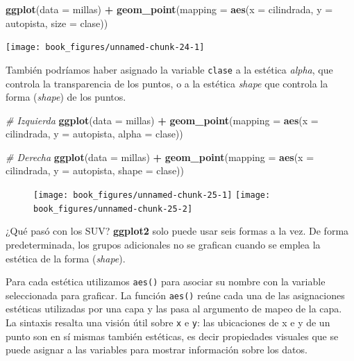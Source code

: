 \documentclass[11pt,oneside]{report}
\newenvironment{Shaded}{\begin{snugshade}}{\end{snugshade}}
\newcommand{\CommentTok}[1]{\textcolor[rgb]{0.56,0.35,0.01}{\textit{#1}}}
\newcommand{\DataTypeTok}[1]{\textcolor[rgb]{0.13,0.29,0.53}{#1}}
\newcommand{\KeywordTok}[1]{\textcolor[rgb]{0.13,0.29,0.53}{\textbf{#1}}}
\newcommand{\NormalTok}[1]{#1}
\newcommand{\OperatorTok}[1]{\textcolor[rgb]{0.81,0.36,0.00}{\textbf{#1}}}
\newcommand{\StringTok}[1]{\textcolor[rgb]{0.31,0.60,0.02}{#1}}
\begin{document}
\begin{Shaded}
\begin{Highlighting}[]
\KeywordTok{ggplot}\NormalTok{(}\DataTypeTok{data =}\NormalTok{ millas) }\OperatorTok{+}
\StringTok{  }\KeywordTok{geom_point}\NormalTok{(}\DataTypeTok{mapping =} \KeywordTok{aes}\NormalTok{(}\DataTypeTok{x =}\NormalTok{ cilindrada, }\DataTypeTok{y =}\NormalTok{ autopista, }\DataTypeTok{size =}\NormalTok{ clase))}
\end{Highlighting}
\end{Shaded}

\begin{center}\texttt{[image: book\_figures/unnamed-chunk-24-1]} \end{center}

También podríamos haber asignado la variable \texttt{clase} a la
estética \emph{alpha}, que controla la transparencia de los puntos, o a
la estética \emph{shape} que controla la forma (\emph{shape}) de los
puntos.

\begin{Shaded}
\begin{Highlighting}[]
\CommentTok{# Izquierda}
\KeywordTok{ggplot}\NormalTok{(}\DataTypeTok{data =}\NormalTok{ millas) }\OperatorTok{+}
\StringTok{  }\KeywordTok{geom_point}\NormalTok{(}\DataTypeTok{mapping =} \KeywordTok{aes}\NormalTok{(}\DataTypeTok{x =}\NormalTok{ cilindrada, }\DataTypeTok{y =}\NormalTok{ autopista, }\DataTypeTok{alpha =}\NormalTok{ clase))}

\CommentTok{# Derecha}
\KeywordTok{ggplot}\NormalTok{(}\DataTypeTok{data =}\NormalTok{ millas) }\OperatorTok{+}
\StringTok{  }\KeywordTok{geom_point}\NormalTok{(}\DataTypeTok{mapping =} \KeywordTok{aes}\NormalTok{(}\DataTypeTok{x =}\NormalTok{ cilindrada, }\DataTypeTok{y =}\NormalTok{ autopista, }\DataTypeTok{shape =}\NormalTok{ clase))}
\end{Highlighting}
\end{Shaded}

\begin{figure}
\texttt{[image: book\_figures/unnamed-chunk-25-1]} \texttt{[image: book\_figures/unnamed-chunk-25-2]} \end{figure}

¿Qué pasó con los SUV? \textbf{ggplot2} solo puede usar seis formas a la
vez. De forma predeterminada, los grupos adicionales no se grafican
cuando se emplea la estética de la forma (\emph{shape}).

Para cada estética utilizamos \texttt{aes()} para asociar su nombre con
la variable seleccionada para graficar. La función \texttt{aes()} reúne
cada una de las asignaciones estéticas utilizadas por una capa y las
pasa al argumento de mapeo de la capa. La sintaxis resalta una visión
útil sobre \texttt{x} e \texttt{y}: las ubicaciones de x e y de un punto
son en sí mismas también estéticas, es decir propiedades visuales que se
puede asignar a las variables para mostrar información sobre los datos.
\end{document}
